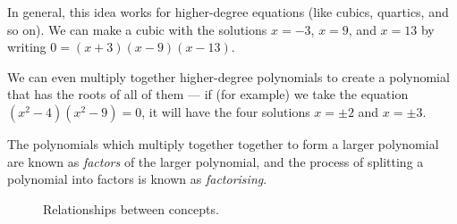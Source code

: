 \documentclass[a4paper,10pt,titlepage]{article}
\theoremstyle{definition}
\begin{document}
In general, this idea works for higher-degree equations (like cubics, quartics,
and so on). We can make a cubic with the solutions $ x = -3 $, $ x = 9 $, and
$ x = 13 $ by writing $ 0 = (x+3)(x-9)(x-13) $.

We can even multiply together higher-degree polynomials to create a polynomial
that has the roots of all of them --- if (for example) we take the equation
$ (x^2 - 4)(x^2 - 9) = 0 $, it will have the four solutions $ x = \pm 2 $ and $ x = \pm 3 $.

The polynomials which multiply together together to form a larger polynomial are known
as \textit{factors} of the larger polynomial, and the process of splitting a polynomial
into factors is known as \textit{factorising}.

\begin{figure}
  \centering
  \caption{Relationships between concepts.}
\end{figure}
\end{document}

